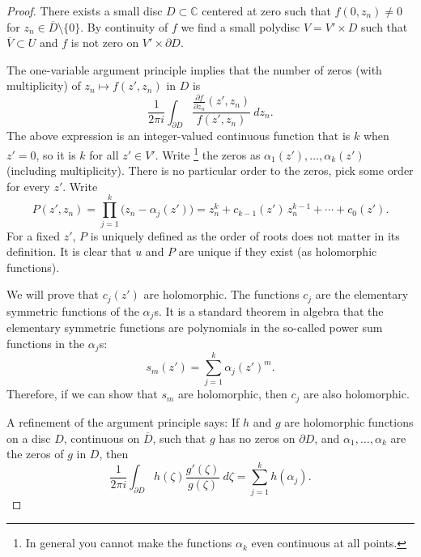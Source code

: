 \documentclass[12pt,openany]{book}
\newcommand{\C}{{\mathbb{C}}}
\theoremstyle{plain}
\theoremstyle{remark}
\theoremstyle{definition}
\theoremstyle{exercise}
\theoremstyle{example}
\begin{document}
\begin{proof}
There exists a small disc $D \subset \C$ centered at zero such that
$f(0,z_n) \not= 0$ for $z_n \in \overline{D} \setminus \{ 0 \}$.
By continuity
of $f$ we find a small polydisc $V = V' \times D$ such that
$\overline{V} \subset U$ and $f$ is not zero on
$V' \times \partial D$.

The one-variable argument principle implies that the number of zeros (with
multiplicity) of $z_n
\mapsto f(z',z_n)$ in $D$ is
\begin{equation*}
\frac{1}{2\pi i}
\int_{\partial D}
\frac{\frac{\partial f}{\partial z_n} (z',z_n)}{f(z',z_n)} ~dz_n .
\end{equation*}
The above expression is an integer-valued
continuous function that is $k$ when $z'=0$,
so it is $k$ for all $z' \in V'$.
Write%
\footnote{In general you cannot make the
functions $\alpha_k$ even continuous at all points.}
the zeros as $\alpha_1(z'),\ldots,\alpha_k(z')$ (including
multiplicity).  There is no particular order to the zeros,
pick some order for every $z'$.
Write
\begin{equation*}
P(z',z_n)
=
\prod_{j=1}^k \bigl(z_n-\alpha_j(z')\bigr)
=
z_n^k + c_{k-1}(z') \, z_n^{k-1} + \cdots + c_0 (z') .
\end{equation*}
For a fixed $z'$, $P$ is uniquely defined as the order of roots does not
matter in its definition.  It is
clear that
$u$ and $P$ are unique if they exist (as holomorphic functions).

We will prove that $c_j(z')$ are holomorphic.  The functions $c_j$ are
the elementary symmetric functions of the $\alpha_j$s.  It is a standard
theorem in algebra that the elementary symmetric functions are
polynomials in the so-called power sum functions in the $\alpha_j$s:
\begin{equation*}
s_m(z') = \sum_{j=1}^k \alpha_j{(z')}^m .
\end{equation*}
Therefore, if we can show that $s_m$ are holomorphic, then $c_j$ are also
holomorphic.

A refinement of the argument principle says:
If $h$ and $g$ are
holomorphic functions on a disc $D$, continuous on $\overline{D}$,
such that $g$ has no zeros on $\partial D$, and $\alpha_1,\ldots,\alpha_k$
are the zeros of $g$ in $D$, then
\begin{equation*}
\frac{1}{2 \pi i}
\int_{\partial D} h(\zeta) \frac{g'(\zeta)}{g(\zeta)} ~d\zeta
= \sum_{j=1}^k h(\alpha_j) .
\end{equation*}


\end{proof}
\end{document}
